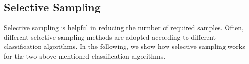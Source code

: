 


\subsection{Selective Sampling} \label{subsec:active:learning}
Selective sampling is helpful in reducing the number of required samples. 
Often, different selective sampling methods are adopted according to different classification algorithms. 
In the following, we show how selective sampling works for the two above-mentioned classification algorithms. %

